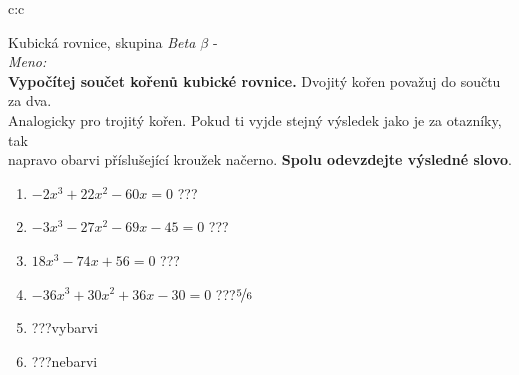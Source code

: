 \documentclass[10pt]{report}
\begin{document}
\clearpage
\thispagestyle{empty}
\begin{tabular}{c:c}
\begin{minipage}[c][99mm][t]{0.49\linewidth}
\begin{center}
\vspace{7mm}
{\huge Kubická rovnice, skupina \textit{Beta $\beta$} -}\\[4.5mm]
\textit{Meno:}\phantom{xxxxxxxxxxxxxxxxxxxxxxxxxxxxxxxxxxxxxxxxxxxxxxxxxxxxxxxxxxxxxxxxx}\\[3.5mm]
\textbf{Vypočítej součet kořenů kubické rovnice.} Dvojitý kořen považuj do součtu za dva.\\Analogicky pro trojitý kořen. Pokud ti vyjde stejný výsledek jako je za otazníky, tak\\napravo obarvi příslušející kroužek načerno. \textbf{Spolu odevzdejte výsledné slovo}.\\[3mm]
\begin{minipage}{0.77\linewidth}
\begin{center}
\begin{varwidth}{\textwidth}
\begin{enumerate}
\large
\item $-2x^3+22x^2-60x=0$\quad \dotfill\; ???\;\dotfill {}
\item $-3x^3-27x^2-69x-45=0$\quad \dotfill\; ???\;\dotfill {}
\item $18x^3-74x+56=0$\quad \dotfill\; ???\;\dotfill {}
\item $-36x^3+30x^2+36x-30=0$\quad \dotfill\; ???\;\dotfill \quad $\nicefrac{5}{6}$
\item \quad \dotfill\; ???\;\dotfill \quad vybarvi
\item \quad \dotfill\; ???\;\dotfill \quad nebarvi
\end{enumerate}
\end{varwidth}
\end{center}
\end{minipage}
\begin{minipage}{0.20\linewidth}
\begin{center}

\end{center}
\end{minipage}
\end{center}
\end{minipage}
\end{tabular}
\end{document}
